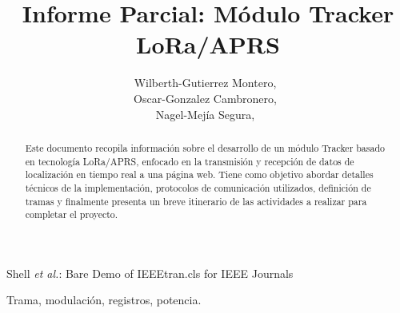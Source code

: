 \documentclass[journal]{IEEEtran}
\begin{document}
%
\title{Informe Parcial: Módulo Tracker LoRa/APRS}

\author{Wilberth-Gutierrez Montero,~ \\
        Oscar-Gonzalez Cambronero,~ \\
        Nagel-Mejía Segura,~
}

%
{Shell \MakeLowercase{\textit{et al.}}: Bare Demo of IEEEtran.cls for IEEE Journals}





\maketitle

\begin{abstract}

Este documento recopila información sobre el desarrollo de un módulo Tracker basado en tecnología LoRa/APRS, enfocado en la transmisión y recepción de datos de localización en tiempo real a una página web. Tiene como objetivo abordar detalles técnicos de la implementación, protocolos de comunicación utilizados, definición de tramas y finalmente presenta un breve itinerario de las actividades a realizar para completar el proyecto.

\end{abstract}

\begin{IEEEkeywords}
Trama, modulación, registros, potencia.
\end{IEEEkeywords}


\IEEEpeerreviewmaketitle
\end{document}
